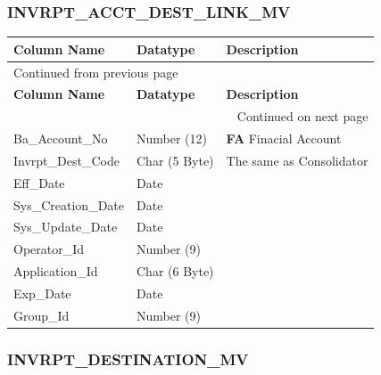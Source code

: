 \documentclass[12pt,twoside]{article}
\begin{document}
\subsubsection{INVRPT\_ACCT\_DEST\_LINK\_MV}
\label{sec:orgheadline154}
\footnotesize

\begin{longtable}{l|l|l}
\hline
\textbf{Column Name} & \textbf{Datatype} & \textbf{Description}\\
\hline
\endfirsthead
\multicolumn{3}{l}{Continued from previous page} \\
\hline

\textbf{Column Name} & \textbf{Datatype} & \textbf{Description} \\

\hline
\endhead
\hline\multicolumn{3}{r}{Continued on next page} \\
\endfoot
\endlastfoot
\hline
Ba\_Account\_No & Number (12) & \textbf{FA} Finacial Account\\
Invrpt\_Dest\_Code & Char (5 Byte) & The same as Consolidator\\
Eff\_Date & Date & \\
Sys\_Creation\_Date & Date & \\
Sys\_Update\_Date & Date & \\
Operator\_Id & Number (9) & \\
Application\_Id & Char (6 Byte) & \\
Exp\_Date & Date & \\
Group\_Id & Number (9) & \\
\hline
\end{longtable}
\normalsize
\subsubsection{INVRPT\_DESTINATION\_MV}
\label{sec:orgheadline155}
\footnotesize
\end{document}
